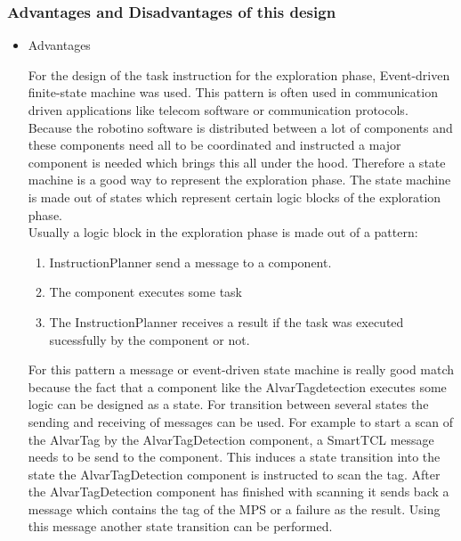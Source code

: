 \subsubsection{Advantages and Disadvantages of this design} 

\begin{itemize}

\item Advantages

For the design of the task instruction for the exploration phase, Event-driven finite-state machine was used. This pattern is often used in communication driven applications
like telecom software or communication protocols. Because the robotino software is distributed between a lot of components and these components need all to be coordinated and instructed a major component is needed which brings this all under the hood. Therefore a state machine is a good way to represent the exploration phase. The state machine is made out of states which represent certain logic blocks of the exploration phase. \\


Usually a logic block in the exploration phase is made out of a pattern:

\begin{enumerate}

\item InstructionPlanner send a message to a component.

\item The component executes some task

\item The InstructionPlanner receives a result if the task was executed sucessfully by the 
component or not.  


\end{enumerate}

For this pattern a message or event-driven state machine is really good match because the fact that a component like the AlvarTagdetection executes some logic can be designed as a state. For transition between several states the sending and receiving of messages can be used. For example to start a scan of the AlvarTag by the AlvarTagDetection component, a SmartTCL message needs to be send to the component. This induces a state transition into the state the AlvarTagDetection component is instructed to scan the tag. After the AlvarTagDetection component has finished with scanning it sends back a message which contains the tag of the MPS or a failure as the result. Using this message another state transition can be performed. \\


\end{itemize}
